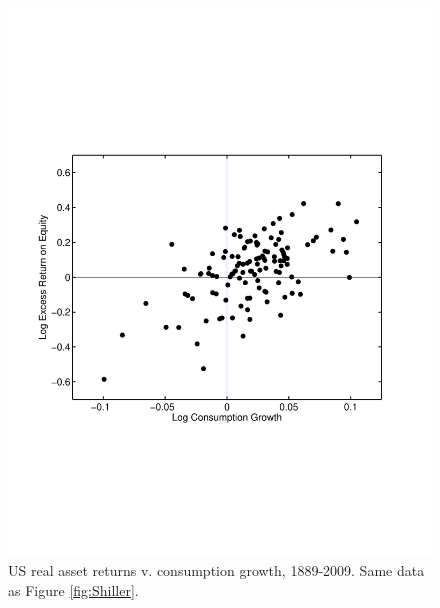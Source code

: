 \documentclass[11pt]{article}
\begin{document}
\pagebreak
\begin{figure}[!h]
\caption{US real asset returns v. consumption growth, 1889-2009.
Same data as Figure \ref{fig:Shiller}.}
\centering
\includegraphics[width=\textwidth]{../Code/Matlab/scatter_gxr.pdf}
\end{figure}



\end{document}
